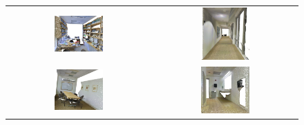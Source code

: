 \begin{figure}[!ht]
    \centering
    \begin{tabular}{cc}
        \includegraphics[width=0.35\textwidth, height=0.15\textheight]{images/seg_output/s3dis_DE/S3DIS_1_RGB.pdf} &
        \includegraphics[width=0.35\textwidth, height=0.15\textheight]{images/seg_output/s3dis_DE/S3DIS_5_RGB.pdf} \\
        
        \includegraphics[width=0.35\textwidth, height=0.15\textheight]{images/seg_output/s3dis_DE/S3DIS_2_RGB.pdf} &
        \includegraphics[width=0.35\textwidth, height=0.15\textheight]{images/seg_output/s3dis_DE/S3DIS_6_RGB.pdf} \\


\end{tabular}
\end{figure}
